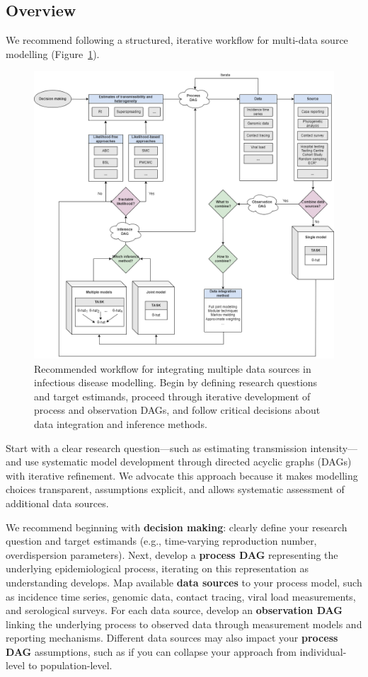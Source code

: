 \documentclass{article}
\begin{document}
\subsection{Overview}

We recommend following a structured, iterative workflow for multi-data source modelling (Figure~\ref{fig:workflow}).

\begin{figure}[htbp]
    \centering
    \includegraphics[width=\textwidth]{figures/workflow-schematic.png}
    \caption{Recommended workflow for integrating multiple data sources in infectious disease modelling. Begin by defining research questions and target estimands, proceed through iterative development of process and observation DAGs, and follow critical decisions about data integration and inference methods.}
    \label{fig:workflow}
\end{figure}
Start with a clear research question—such as estimating transmission intensity—and use systematic model development through directed acyclic graphs (DAGs) with iterative refinement.
We advocate this approach because it makes modelling choices transparent, assumptions explicit, and allows systematic assessment of additional data sources.

We recommend beginning with \textbf{decision making}: clearly define your research question and target estimands (e.g., time-varying reproduction number, overdispersion parameters).
Next, develop a \textbf{process DAG} representing the underlying epidemiological process, iterating on this representation as understanding develops.
Map available \textbf{data sources} to your process model, such as incidence time series, genomic data, contact tracing, viral load measurements, and serological surveys.
For each data source, develop an \textbf{observation DAG} linking the underlying process to observed data through measurement models and reporting mechanisms.
Different data sources may also impact your \textbf{process DAG} assumptions, such as if you can collapse your approach from individual-level to population-level.
\end{document}
